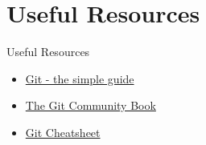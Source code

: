 \documentclass{beamer}
\begin{document}
\section{Useful Resources} %
\label{sec:useful_resources}
\begin{frame}{Useful Resources}
	 \begin{itemize}
	 	\item \href{https://rogerdudler.github.io/git-guide/}{Git - the simple guide}
	 	\item \href{https://book.git-scm.com}{The Git Community Book}
	 	\item \href{https://rogerdudler.github.io/git-guide/files/git_cheat_sheet.pdf}{Git Cheatsheet}
	 \end{itemize}
\end{frame}
\end{document}
